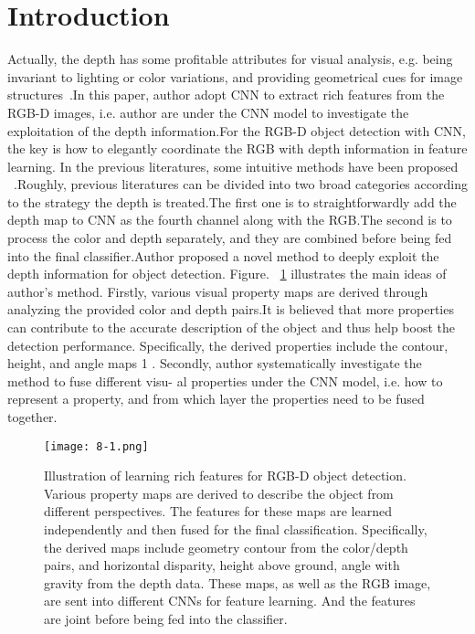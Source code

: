 \documentclass[10pt,twocolumn,letterpaper]{article}
\begin{document}
\section{Introduction}
Actually, the depth has some profitable attributes for visual analysis, e.g. being invariant to lighting or color variations, and providing geometrical cues for image structures~\cite{Convolutional2012_1}.In this paper, author adopt CNN to extract rich features from the RGB-D images, i.e. author are under the CNN model to investigate the exploitation of the depth information.For the RGB-D object detection with CNN, the key is how to elegantly coordinate the RGB with depth information in feature learning. In the previous literatures, some intuitive methods have been proposed ~\cite{Indoor2013_2, Learning2014_3}.Roughly, previous literatures can be divided into two broad categories according to the strategy the depth is treated.The first one is to straightforwardly add the depth map to CNN as the fourth channel along with the RGB.The second is to process the color and
depth separately, and they are combined before being fed into the final classifier.Author proposed a novel method to deeply exploit the depth information
for object detection. Figure. ~\ref{fig:onepicture} illustrates the main ideas of
author's method.
Firstly, various visual property maps are derived through analyzing the provided color and depth pairs.It is believed that more properties can contribute to the accurate description of the object and thus help boost the detection performance. Specifically, the derived properties include the contour, height, and angle maps 1 . Secondly, author systematically investigate the method to fuse different visu-
al properties under the CNN model, i.e. how to represent a property, and from which layer the properties need to be fused together.
\begin{figure}[htb]
\centering
\texttt{[image: 8-1.png]}
\caption{Illustration of learning rich features for RGB-D object detection. Various property maps are derived to describe the object from different perspectives. The features for these maps are learned independently and then fused for the final classification. Specifically, the derived maps include geometry contour from the color/depth pairs, and horizontal disparity, height above ground,
angle with gravity from the depth data. These maps, as well as the RGB image, are sent into different CNNs for feature learning. And the features are joint before being fed into the classifier.}
\label{fig:onepicture}
\end{figure}


{\small


}
\end{document}
